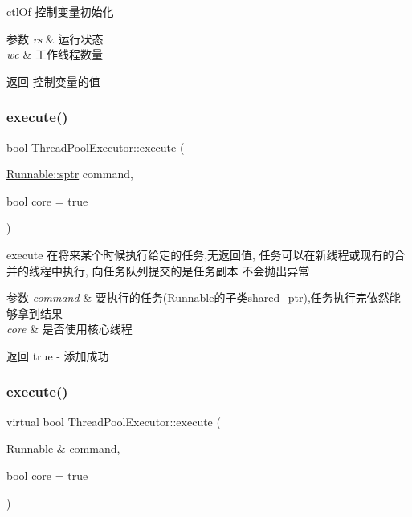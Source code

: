 ctl\+Of 控制变量初始化 


\begin{DoxyParams}{参数}
{\em rs} & 运行状态 \\
\hline
{\em wc} & 工作线程数量\\
\hline
\end{DoxyParams}
\begin{DoxyReturn}{返回}
控制变量的值 
\end{DoxyReturn}
\mbox{\label{classThreadPoolExecutor_a4dac3c2435919af5d77aa36069d35bc7}} 
\subsubsection{\texorpdfstring{execute()}{execute()}\hspace{0.1cm}{\footnotesize\ttfamily [1/3]}}
{\footnotesize\ttfamily bool Thread\+Pool\+Executor\+::execute (\begin{DoxyParamCaption}\item[{\hyperlink{classRunnable_abe8d3066c7305401d6f0aad8e70780f2}{Runnable\+::sptr}}]{command,  }\item[{bool}]{core = {\ttfamily true} }\end{DoxyParamCaption})}



execute 在将来某个时候执行给定的任务,无返回值, 任务可以在新线程或现有的合并的线程中执行, 向任务队列提交的是任务副本 不会抛出异常 


\begin{DoxyParams}{参数}
{\em command} & 要执行的任务(Runnable的子类shared\+\_\+ptr),任务执行完依然能够拿到结果 \\
\hline
{\em core} & 是否使用核心线程\\
\hline
\end{DoxyParams}
\begin{DoxyReturn}{返回}
true -\/ 添加成功 
\end{DoxyReturn}
\mbox{\label{classThreadPoolExecutor_a523df0545790ef03a82623b05e3b20f9}} 
\subsubsection{\texorpdfstring{execute()}{execute()}\hspace{0.1cm}{\footnotesize\ttfamily [2/3]}}
{\footnotesize\ttfamily virtual bool Thread\+Pool\+Executor\+::execute (\begin{DoxyParamCaption}\item[{\hyperlink{classRunnable}{Runnable} \&}]{command,  }\item[{bool}]{core = {\ttfamily true} }\end{DoxyParamCaption})\hspace{0.3cm}{\ttfamily [virtual]}}



